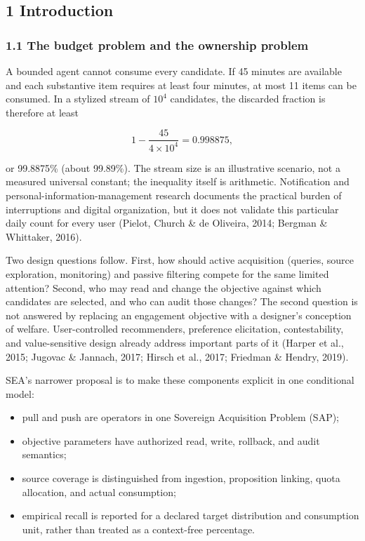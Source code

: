 \documentclass[
  11pt]{article}
\providecommand{\tightlist}{%
  \setlength{\itemsep}{0pt}\setlength{\parskip}{0pt}}
\begin{document}
\subsection{1 Introduction}\label{introduction}

\subsubsection{1.1 The budget problem and the ownership
problem}\label{the-budget-problem-and-the-ownership-problem}

A bounded agent cannot consume every candidate. If 45 minutes are
available and each substantive item requires at least four minutes, at
most 11 items can be consumed. In a stylized stream of \(10^4\)
candidates, the discarded fraction is therefore at least

\[1-\frac{45}{4\times 10^4}=0.998875,\]

or 99.8875\% (about 99.89\%). The stream size is an illustrative
scenario, not a measured universal constant; the inequality itself is
arithmetic. Notification and personal-information-management research
documents the practical burden of interruptions and digital
organization, but it does not validate this particular daily count for
every user (Pielot, Church \& de Oliveira, 2014; Bergman \& Whittaker,
2016).

Two design questions follow. First, how should active acquisition
(queries, source exploration, monitoring) and passive filtering compete
for the same limited attention? Second, who may read and change the
objective against which candidates are selected, and who can audit those
changes? The second question is not answered by replacing an engagement
objective with a designer's conception of welfare. User-controlled
recommenders, preference elicitation, contestability, and
value-sensitive design already address important parts of it (Harper et
al., 2015; Jugovac \& Jannach, 2017; Hirsch et al., 2017; Friedman \&
Hendry, 2019).

SEA's narrower proposal is to make these components explicit in one
conditional model:

\begin{itemize}
\tightlist
\item
  pull and push are operators in one Sovereign Acquisition Problem
  (SAP);
\item
  objective parameters have authorized read, write, rollback, and audit
  semantics;
\item
  source coverage is distinguished from ingestion, proposition linking,
  quota allocation, and actual consumption;
\item
  empirical recall is reported for a declared target distribution and
  consumption unit, rather than treated as a context-free percentage.
\end{itemize}
\end{document}
